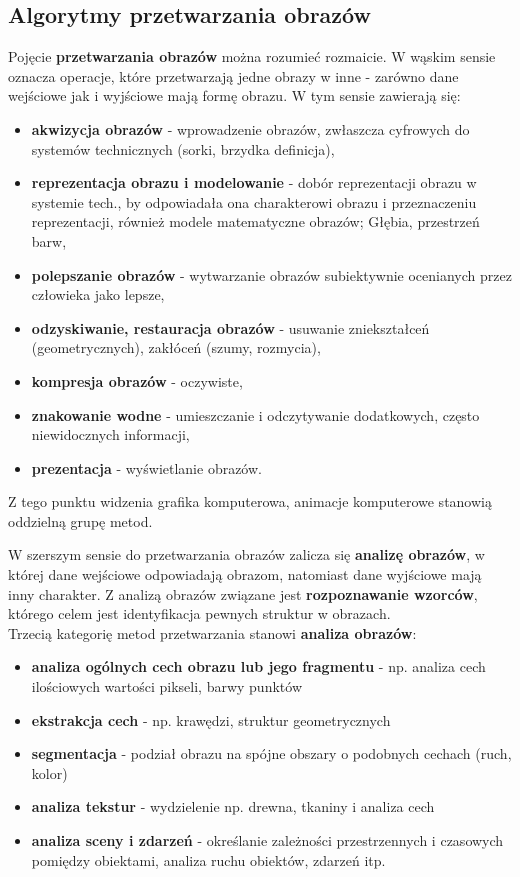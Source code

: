 \documentclass[a4paper,twoside]{report}
\begin{document}
\subsection{Algorytmy przetwarzania obrazów}
Pojęcie \textbf{przetwarzania obrazów} można rozumieć rozmaicie. W wąskim sensie oznacza operacje, które przetwarzają jedne obrazy w inne - zarówno dane wejściowe jak i wyjściowe mają formę obrazu. W tym sensie zawierają się:
\begin{itemize}
	\item \textbf{akwizycja obrazów} - wprowadzenie obrazów, zwłaszcza cyfrowych do systemów technicznych (sorki, brzydka definicja),
	\item \textbf{reprezentacja obrazu i modelowanie} - dobór reprezentacji obrazu w systemie tech., by odpowiadała ona charakterowi obrazu i przeznaczeniu reprezentacji, również modele matematyczne obrazów; Głębia, przestrzeń barw,
	\item \textbf{polepszanie obrazów} - wytwarzanie obrazów subiektywnie ocenianych przez człowieka jako lepsze,
	\item \textbf{odzyskiwanie, restauracja obrazów} - usuwanie zniekształceń (geometrycznych), zakłóceń (szumy, rozmycia),
	\item \textbf{kompresja obrazów} - oczywiste,
	\item \textbf{znakowanie wodne} - umieszczanie i odczytywanie dodatkowych, często niewidocznych informacji,
	\item \textbf{prezentacja} - wyświetlanie obrazów.
\end{itemize}
Z tego punktu widzenia grafika komputerowa, animacje komputerowe stanowią oddzielną grupę metod.
	
W szerszym sensie do przetwarzania obrazów zalicza się \textbf{analizę obrazów}, w której dane wejściowe odpowiadają obrazom, natomiast dane wyjściowe mają inny charakter. Z analizą obrazów związane jest \textbf{rozpoznawanie wzorców}, którego celem jest identyfikacja pewnych struktur w obrazach.\\
	
Trzecią kategorię metod przetwarzania stanowi \textbf{analiza obrazów}:
\begin{itemize}
	\item \textbf{analiza ogólnych cech obrazu lub jego fragmentu} - np. analiza cech ilościowych wartości pikseli, barwy punktów
	\item \textbf{ekstrakcja cech} - np. krawędzi, struktur geometrycznych
	\item \textbf{segmentacja} - podział obrazu na spójne obszary o podobnych cechach (ruch, kolor)
	\item \textbf{analiza tekstur} - wydzielenie np. drewna, tkaniny i analiza cech
	\item \textbf{analiza sceny i zdarzeń} - określanie zależności przestrzennych i czasowych pomiędzy obiektami, analiza ruchu obiektów, zdarzeń itp.
\end{itemize}
\end{document}
